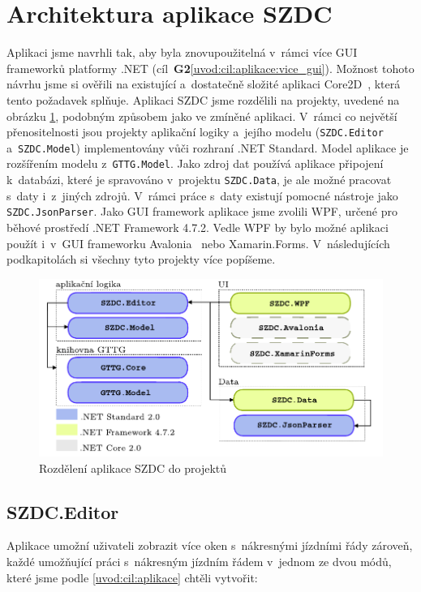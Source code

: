 \section{Architektura aplikace SZDC}
\label{kap6:szdc_gui_framework}
Aplikaci jsme navrhli tak, aby byla znovupoužitelná v~rámci více GUI frameworků platformy .NET (cíl~\textbf{\color{goalcolor}G2}\ref{uvod:cil:aplikace:vice_gui}). Možnost tohoto návrhu jsme si ověřili na existující a~dostatečně složité aplikaci Core2D~\cite{Core2D}, která tento požadavek splňuje. Aplikaci SZDC jsme rozdělili na projekty, uvedené na obrázku \ref{fig:kap6:szdc_structure}, podobným způsobem jako ve zmíněné aplikaci. V~rámci co největší přenositelnosti jsou projekty aplikační logiky a~jejího modelu (\texttt{SZDC.Editor} a~\texttt{SZDC.Model}) implementovány vůči rozhraní .NET Standard. Model aplikace je rozšířením modelu z~\texttt{GTTG.Model}. Jako zdroj dat používá aplikace připojení k~databázi, které je spravováno v~projektu \texttt{SZDC.Data}, je ale možné pracovat s~daty i~z~jiných zdrojů. V~rámci práce s~daty existují pomocné nástroje jako \texttt{SZDC.JsonParser}. Jako GUI framework aplikace jsme zvolili WPF, určené pro běhové prostředí .NET Framework 4.7.2. Vedle WPF by bylo možné aplikaci použít i~v~GUI frameworku Avalonia~\cite{Avalonia} nebo Xamarin.Forms. V~následujících podkapitolách si všechny tyto projekty více popíšeme.

\begin{figure}[!hbt]
	\centering
	\includegraphics[width=\textwidth]{../img/kap6_szdc_structure}
	\caption{Rozdělení aplikace SZDC do projektů}
	\label{fig:kap6:szdc_structure}
\end{figure}

\subsection*{SZDC.Editor}
Aplikace umožní uživateli zobrazit více oken s~nákresnými jízdními řády zároveň, každé umožňující práci s~nákresným jízdním řádem v~jednom ze dvou módů, které jsme podle \ref{uvod:cil:aplikace} chtěli vytvořit:

